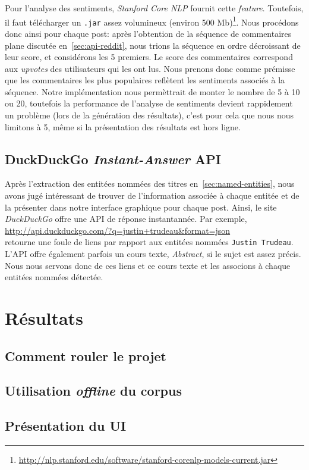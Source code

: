 \documentclass[12pt]{article}
\begin{document}
Pour l'analyse des sentiments, \textit{Stanford Core NLP} fournit cette \textit{feature}. Toutefois, il faut télécharger un \verb;.jar; assez volumineux (environ 500 Mb)\footnote{\url{http://nlp.stanford.edu/software/stanford-corenlp-models-current.jar}}. Nous procédons donc ainsi pour chaque post: après l'obtention de la séquence de commentaires plane discutée en~\ref{sec:api-reddit}, nous trions la séquence en ordre décroissant de leur score, et considérons les 5 premiers. Le score des commentaires correspond aux \textit{upvotes} des utilisateurs qui les ont lus. Nous prenons donc comme prémisse que les commentaires les plus populaires reflètent les sentiments associés à la séquence. Notre implémentation nous permèttrait de monter le nombre de 5 à 10 ou 20, toutefois la performance de l'analyse de sentiments devient rappidement un problème (lors de la génération des résultats), c'est pour cela que nous nous limitons à 5, même si la présentation des résultats est hors ligne.

\subsection{DuckDuckGo \textit{Instant-Answer} API}

Après l'extraction des entitées nommées des titres en~\ref{sec:named-entities}, nous avons jugé intéressant de trouver de l'information associée à chaque entitée et de la présenter dans notre interface graphique pour chaque post. Ainsi, le site \textit{DuckDuckGo} offre une API de réponse instantannée. Par exemple,\\

\url{http://api.duckduckgo.com/?q=justin+trudeau&format=json}\\

retourne une foule de liens par rapport aux entitées nommées \verb;Justin Trudeau;. L'API offre également parfois un cours texte, \textit{Abstract}, si le sujet est assez précis. Nous nous servons donc de ces liens et ce cours texte et les associons à chaque entitées nommées détectée.

\section{Résultats}

\subsection{Comment rouler le projet}
\subsection{Utilisation \textit{offline} du corpus}
\subsection{Présentation du UI}

\end{document}
